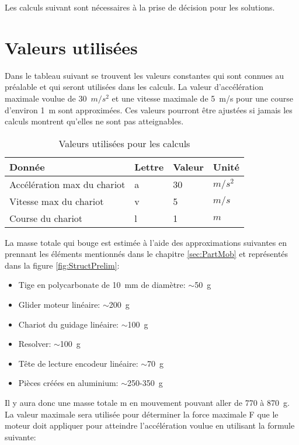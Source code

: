 Les calculs suivant sont nécessaires à la prise de décision pour les solutions.

\section{Valeurs utilisées}\label{sec:ValUtil}
Dans le tableau suivant se trouvent les valeurs constantes qui sont connues au préalable et qui seront utilisées dans les calculs.
La valeur d'accélération maximale voulue de 30~$m/s^2$ et une vitesse maximale de 5~m/s pour une course d'environ 1~m sont approximées.
Ces valeurs pourront être ajustées si jamais les calculs montrent qu'elles ne sont pas atteignables.

\begin{table}[H]
    \centering
    \caption{Valeurs utilisées pour les calculs}
    \label{tab:ValUtil}
    \begin{tabular}{|l|l|l|l|}
        \hline
        \textbf{Donnée}             & \textbf{Lettre} & \textbf{Valeur} & \textbf{Unité} \\ \hline
        Accélération max du chariot & a               & 30              & $m/s^2$        \\ \hline
        Vitesse max du chariot      & v               & 5               & $m/s$          \\ \hline
        Course du chariot           & l               & 1               & $m$            \\ \hline
    \end{tabular}%
\end{table}

La masse totale qui bouge est estimée à l'aide des approximations suivantes en prennant les éléments mentionnés dans le chapitre \ref{sec:PartMob}
et représentés dans la figure \ref{fig:StructPrelim}:
\begin{itemize}
    \item Tige en polycarbonate de 10~mm de diamètre: $\sim$50~g
    \item Glider moteur linéaire: $\sim$200~g
    \item Chariot du guidage linéaire: $\sim$100~g
    \item Resolver: $\sim$100~g
    \item Tête de lecture encodeur linéaire: $\sim$70~g
    \item Pièces créées en aluminium: $\sim$250-350~g
\end{itemize}

Il y aura donc une masse totale m en mouvement pouvant aller de 770 à 870~g. La valeur maximale sera utilisée pour déterminer la force maximale F
que le moteur doit appliquer pour atteindre l'accélération voulue en utilisant la formule suivante:

